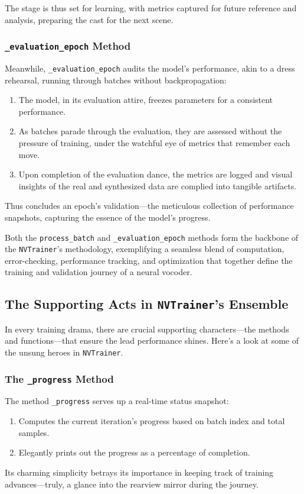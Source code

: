 \documentclass[a4paper]{article}
\begin{document}
The stage is thus set for learning, with metrics captured for future reference and analysis, preparing the cast for the next scene.


\subsubsection{\texttt{\_evaluation\_epoch} Method}

Meanwhile, \texttt{\_evaluation\_epoch} audits the model’s performance, akin to a dress rehearsal, running through batches without backpropagation:

\begin{enumerate}
  \item The model, in its evaluation attire, freezes parameters for a consistent performance.
  \item As batches parade through the evaluation, they are assessed without the pressure of training, under the watchful eye of metrics that remember each move.
  \item Upon completion of the evaluation dance, the metrics are logged and visual insights of the real and synthesized data are complied into tangible artifacts.
\end{enumerate}

Thus concludes an epoch's validation—the meticulous collection of performance snapshots, capturing the essence of the model's progress.


Both the \texttt{process\_batch} and \texttt{\_evaluation\_epoch} methods form the backbone of the \texttt{NVTrainer}'s methodology, exemplifying a seamless blend of computation, error-checking, performance tracking, and optimization that together define the training and validation journey of a neural vocoder.


\subsection{The Supporting Acts in \texttt{NVTrainer}'s Ensemble}

In every training drama, there are crucial supporting characters—the methods and functions—that ensure the lead performance shines. Here's a look at some of the unsung heroes in \texttt{NVTrainer}.

\subsubsection{The \texttt{\_progress} Method}
The method \texttt{\_progress} serves up a real-time status snapshot:
\begin{enumerate}
  \item Computes the current iteration's progress based on batch index and total samples.
  \item Elegantly prints out the progress as a percentage of completion.
\end{enumerate}
Its charming simplicity betrays its importance in keeping track of training advances—truly, a glance into the rearview mirror during the journey.
\end{document}

